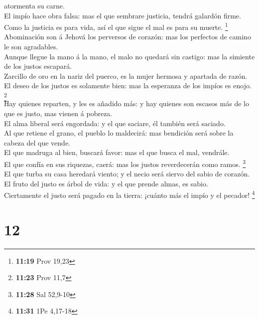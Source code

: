 atormenta su carne.\\
 El impío hace obra falsa: mas el que sembrare justicia,
tendrá galardón firme.\\
 Como la justicia es para vida, así el que sigue el mal es
para su muerte. \footnote{\textbf{11:19} Prov 19,23}\\
 Abominación son á Jehová los perversos de corazón: mas los
perfectos de camino le son agradables.\\
 Aunque llegue la mano á la mano, el malo no quedará sin
castigo: mas la simiente de los justos escapará.\\
 Zarcillo de oro en la nariz del puerco, es la mujer
hermosa y apartada de razón.\\
 El deseo de los justos es solamente bien: mas la esperanza
de los impíos es enojo. \footnote{\textbf{11:23} Prov 11,7}\\
 Hay quienes reparten, y les es añadido más: y hay quienes
son escasos más de lo que es justo, mas vienen á pobreza.\\
 El alma liberal será engordada: y el que saciare, él
también será saciado.\\
 Al que retiene el grano, el pueblo lo maldecirá: mas
bendición será sobre la cabeza del que vende.\\
 El que madruga al bien, buscará favor: mas el que busca el
mal, vendrále.\\
 El que confía en sus riquezas, caerá: mas los justos
reverdecerán como ramos. \footnote{\textbf{11:28} Sal 52,9-10}\\
 El que turba su casa heredará viento; y el necio será
siervo del sabio de corazón.\\
 El fruto del justo es árbol de vida: y el que prende
almas, es sabio.\\
 Ciertamente el justo será pagado en la tierra: ¡cuánto más
el impío y el pecador! \footnote{\textbf{11:31} 1Pe 4,17-18}

\hypertarget{section-11}{%
\section{12}\label{section-11}}

